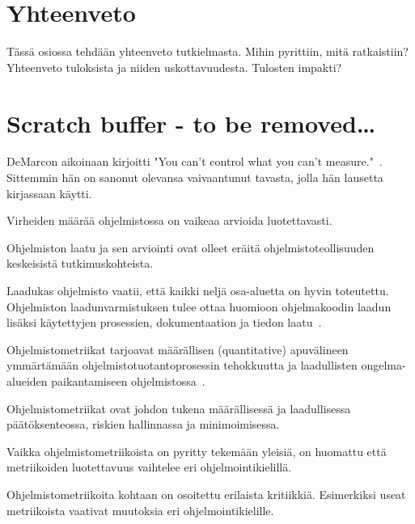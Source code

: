 \documentclass[finnish]{tktltiki2}
\theoremstyle{definition}
\theoremstyle{remark}
\begin{document}
\section{Yhteenveto}

Tässä osiossa tehdään yhteenveto tutkielmasta. Mihin pyrittiin, mitä ratkaistiin? Yhteenveto tuloksista ja niiden uskottavuudesta. Tulosten impakti?


\section{Scratch buffer - to be removed\dots}

DeMarcon aikoinaan kirjoitti "You can't control what you can't measure."~\cite{DM86}. Sittemmin hän on sanonut olevansa vaivaantunut tavasta, jolla hän lausetta kirjassaan käytti.

Virheiden määrää ohjelmistossa on vaikeaa arvioida luotettavasti.

Ohjelmiston laatu ja sen arviointi ovat olleet eräitä ohjelmistoteollisuuden keskeisistä tutkimuskohteista.

Laadukas ohjelmisto vaatii, että kaikki neljä osa-aluetta on hyvin toteutettu. Ohjelmiston laadunvarmistuksen tulee ottaa huomioon ohjelmakoodin laadun lisäksi käytettyjen prosessien, dokumentaation ja tiedon laatu~\cite{G04}.

Ohjelmistometriikat tarjoavat määrällisen (quantitative) apuvälineen ymmärtämään ohjelmistotuotantoprosessin tehokkuutta ja laadullisten ongelma-alueiden paikantamiseen ohjelmistossa~\cite{PI92}.

Ohjelmistometriikat ovat johdon tukena määrällisessä ja laadullisessa päätöksenteossa, riskien hallinnassa ja minimoimisessa.

Vaikka ohjelmistometriikoista on pyritty tekemään yleisiä, on huomattu että metriikoiden luotettavuus vaihtelee eri ohjelmointikielillä.

Ohjelmistometriikoita kohtaan on osoitettu erilaista kritiikkiä. Esimerkiksi useat metriikoista vaativat muutoksia eri ohjelmointikielille.


%
%
% 
%







%
\end{document}
